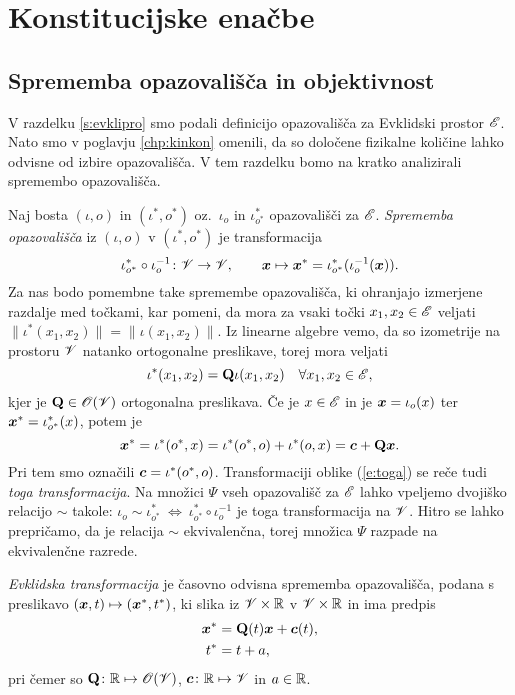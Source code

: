 \appendix

\chapter{Konstitucijske enačbe}


\section{Sprememba opazovališča in objektivnost}


V razdelku \ref{s:evklipro} smo podali definicijo opazovališča za Evklidski
prostor $\mathscr E$. Nato smo v poglavju \ref{chp:kinkon} omenili, da so določene
fizikalne količine lahko odvisne od izbire opazovališča. V tem razdelku bomo
na kratko analizirali spremembo opazovališča.


Naj bosta $(\iota,o)$ in $(\iota^*,o^*)$ oz.~$\iota_o$ in $\iota^*_{o^*}$
opazovališči za $\mathscr E$. \emph{Sprememba opazovališča} iz
$(\iota,o)$ v $(\iota^*,o^*)$ je transformacija
\[
	\iota^*_{o^*}\circ\iota_o^{-1}\colon\mathscr V\to\mathscr V,\qquad
	\boldsymbol x\mapsto\boldsymbol x^*=\iota^*_{o^*}(\iota_o^{-1}(\boldsymbol x)).
\]
Za nas bodo pomembne take spremembe opazovališča, ki ohranjajo izmerjene razdalje
med točkami, kar pomeni, da mora za vsaki točki $x_1,x_2\in\mathscr E$ veljati
$\|\iota^*(x_1,x_2)\|=\|\iota(x_1,x_2)\|$. Iz linearne algebre vemo,
da so izometrije na prostoru $\mathscr V$ natanko ortogonalne preslikave,
torej mora veljati
\[
	\iota^*(x_1,x_2)=\mathbf Q\iota(x_1,x_2)\quad\forall x_1,x_2\in\mathscr E,
\]
kjer je $\mathbf Q\in\mathscr{O}(\mathscr V)$ ortogonalna preslikava. Če je $x\in\mathscr E$ in
je $\boldsymbol x=\iota_o(x)$ ter $\boldsymbol x^*=\iota^*_{o^*}(x)$, potem je
\begin{equation} \label{e:toga}
	\boldsymbol x^*=\iota^*(o^*,x)=\iota^*(o^*,o)+\iota^*(o,x)=\boldsymbol c+\mathbf Q\boldsymbol x.
\end{equation}
Pri tem smo označili $\boldsymbol c=\iota^*(o^*,o)$. Transformaciji oblike (\ref{e:toga})
se reče tudi \emph{toga transformacija}. Na množici $\Psi$ vseh opazovališč
za $\mathscr E$ lahko vpeljemo dvojiško relacijo $\sim$ takole:
$\iota_o\sim\iota^*_{o^*}\ \Leftrightarrow\ \iota^*_{o^*}\circ\iota_o^{-1}$ je toga
transformacija na $\mathscr V$. Hitro se lahko prepričamo, da je relacija $\sim$ ekvivalenčna,
torej množica $\Psi$ razpade na ekvivalenčne razrede.

\begin{definicija}
	\emph{Evklidska transformacija} je časovno odvisna sprememba opazovališča,
	podana s preslikavo $(\boldsymbol x,t)\mapsto(\boldsymbol x^*,t^*)$, ki slika iz
	$\mathscr V\times\mathbb R$ v $\mathscr V\times\mathbb R$ in ima predpis
	\begin{align*}
		\boldsymbol x^*&=\mathbf Q(t)\boldsymbol x+\boldsymbol c(t),\\
		t^*&=t+a,
	\end{align*}
	pri čemer so $\mathbf Q\colon\mathbb R\mapsto\mathscr{O}(\mathscr V)$, $\boldsymbol c\colon\mathbb R\mapsto\mathscr V$
	in $a\in\mathbb R$.
\end{definicija}

